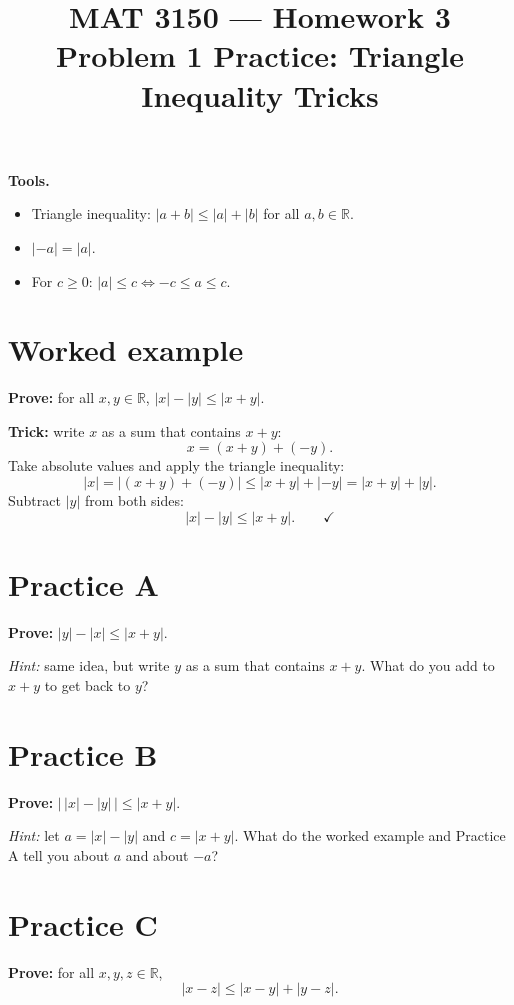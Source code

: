 \documentclass[11pt]{article}
\title{MAT 3150 --- Homework 3\\
\large Problem 1 Practice: Triangle Inequality Tricks}
\author{}
\date{}
\begin{document}
\maketitle

\textbf{Tools.}
\begin{itemize}
  \item Triangle inequality: $|a+b|\le|a|+|b|$ for all $a,b\in\mathbb{R}$.
  \item $|-a| = |a|$.
  \item For $c\ge 0$: \quad $|a|\le c \iff -c\le a\le c$.
\end{itemize}

\section*{Worked example}
\textbf{Prove:} for all $x,y\in\mathbb{R}$, \quad $|x|-|y|\le|x+y|$.

\textbf{Trick:} write $x$ as a sum that contains $x+y$:
\[
  x = (x+y) + (-y).
\]
Take absolute values and apply the triangle inequality:
\[
  |x| = |(x+y)+(-y)| \le |x+y| + |-y| = |x+y| + |y| .
\]
Subtract $|y|$ from both sides:
\[
  |x|-|y| \le |x+y| . \qquad \checkmark
\]

\section*{Practice A}
\textbf{Prove:} $|y|-|x|\le|x+y|$.

\emph{Hint:} same idea, but write $y$ as a sum that contains $x+y$.
What do you add to $x+y$ to get back to $y$?

\vspace{3cm}

\section*{Practice B}
\textbf{Prove:} $\bigl|\,|x|-|y|\,\bigr|\le|x+y|$.

\emph{Hint:} let $a=|x|-|y|$ and $c=|x+y|$. What do the worked example
and Practice A tell you about $a$ and about $-a$?

\vspace{3cm}

\section*{Practice C}
\textbf{Prove:} for all $x,y,z\in\mathbb{R}$,
\[
  |x-z| \le |x-y| + |y-z| .
\]
\end{document}
